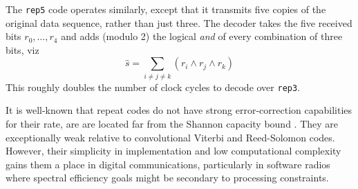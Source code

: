 The {\tt rep5} code operates similarly, except that it transmits five copies
of the original data sequence, rather than just three.
The decoder takes the five received bits $r_0,\ldots,r_4$ and adds (modulo
2) the logical {\it and} of every combination of three bits, viz
\[
    \hat{s} = \sum_{i\ne j \ne k} {(r_i \land r_j \land r_k)}
\]
This roughly doubles the number of clock cycles to decode over {\tt rep3}.

It is well-known that repeat codes do not have strong error-correction
capabilities for their rate, are are located far from the Shannon capacity
bound \cite{Proakis:2001}.
They are exceptionally weak relative to convolutional Viterbi and Reed-Solomon
codes.
However, their simplicity in implementation and low computational complexity
gains them a place in digital communications, particularly in software radios
where spectral efficiency goals might be secondary to processing constraints.

